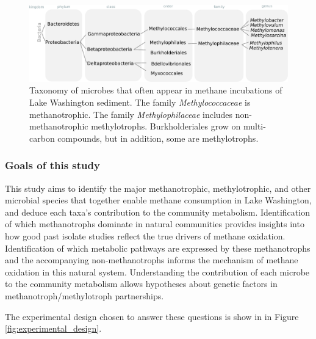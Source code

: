 \begin{figure}[H]
\centering
    \includegraphics[width=1.0\textwidth]{./tex/chapter2/figures/170311_taxonomy_overview.pdf}
    \begin{singlespace}
    \caption[Taxonomy of microbes known to factor into methane oxidation in Lake Washington sediment]{
       Taxonomy of microbes that often appear in methane incubations of Lake Washington sediment.
       The family \textit{Methylococcaceae} is methanotrophic.
       The family \textit{Methylophilaceae} includes non-methanotrophic methylotrophs.
       Burkholderiales grow on multi-carbon compounds, but in addition, some are methylotrophs.}
    \label{fig:taxonomy}
    \end{singlespace}
\end{figure}

\subsubsection{Goals of this study}
This study aims to identify the major methanotrophic, methylotrophic, and other microbial species that together enable methane consumption in Lake Washington, and deduce each taxa's contribution to the community metabolism.
Identification of which methanotrophs dominate in natural communities provides insights into how good past isolate studies reflect the true drivers of methane oxidation.
Identification of which metabolic pathways are expressed by these methanotrophs and the accompanying non-methanotrophs informs the mechanism of methane oxidation in this natural system.
Understanding the contribution of each microbe to the community metabolism allows hypotheses about genetic factors in methanotroph/methylotroph partnerships.


The experimental design chosen to answer these questions is show in in Figure \ref{fig:experimental_design}.

